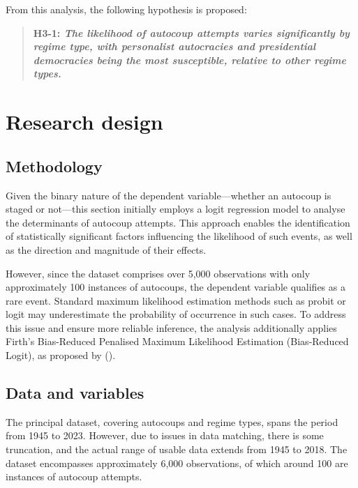 \documentclass[
  12pt,
]{report}
\begin{document}
From this analysis, the following hypothesis is proposed:

\begin{quote}
\textbf{H3-1: \emph{The likelihood of autocoup attempts varies
significantly by regime type, with personalist autocracies and
presidential democracies being the most susceptible, relative to other
regime types.}}
\end{quote}

\section{Research design}\label{research-design}

\subsection*{Methodology}\label{methodology}

Given the binary nature of the dependent variable---whether an autocoup
is staged or not---this section initially employs a logit regression
model to analyse the determinants of autocoup attempts. This approach
enables the identification of statistically significant factors
influencing the likelihood of such events, as well as the direction and
magnitude of their effects.

However, since the dataset comprises over 5,000 observations with only
approximately 100 instances of autocoups, the dependent variable
qualifies as a rare event. Standard maximum likelihood estimation
methods such as probit or logit may underestimate the probability of
occurrence in such cases. To address this issue and ensure more reliable
inference, the analysis additionally applies Firth's Bias-Reduced
Penalised Maximum Likelihood Estimation (Bias-Reduced Logit), as
proposed by ().

\subsection*{Data and variables}\label{data-and-variables}

The principal dataset, covering autocoups and regime types, spans the
period from 1945 to 2023. However, due to issues in data matching, there
is some truncation, and the actual range of usable data extends from
1945 to 2018. The dataset encompasses approximately 6,000 observations,
of which around 100 are instances of autocoup attempts.
\end{document}
